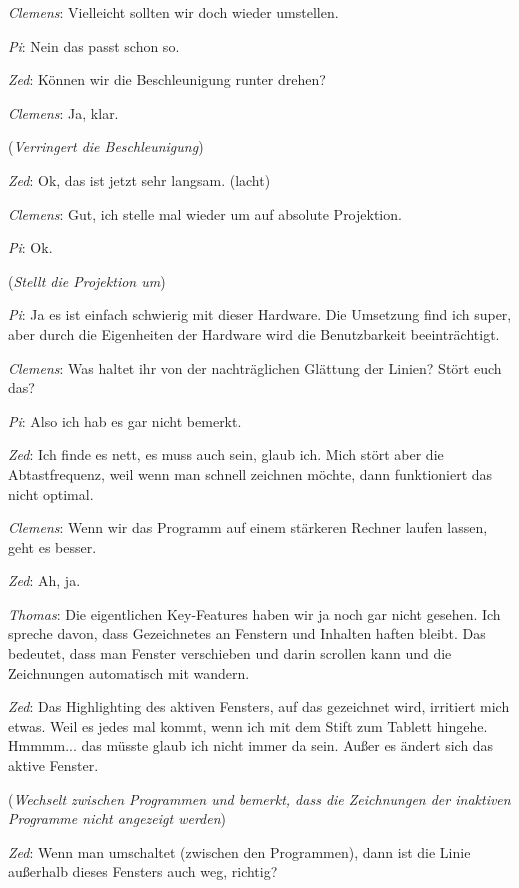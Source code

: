 \medskip \emph{Clemens}: Vielleicht sollten wir doch wieder umstellen.

\medskip \emph{Pi}: Nein das passt schon so.

\medskip \emph{Zed}: Können wir die Beschleunigung runter drehen?

\medskip \emph{Clemens}: Ja, klar.

\medskip (\emph{Verringert die Beschleunigung})

\medskip \emph{Zed}: Ok, das ist jetzt sehr langsam. (lacht)

\medskip \emph{Clemens}: Gut, ich stelle mal wieder um auf absolute Projektion.

\medskip \emph{Pi}: Ok.

\medskip (\emph{Stellt die Projektion um})

\medskip \emph{Pi}: Ja es ist einfach schwierig mit dieser Hardware. Die Umsetzung find ich super, aber durch die Eigenheiten der Hardware wird die Benutzbarkeit beeinträchtigt.

\medskip \emph{Clemens}: Was haltet ihr von der nachträglichen Glättung der Linien? Stört euch das?

\medskip \emph{Pi}: Also ich hab es gar nicht bemerkt.

\medskip \emph{Zed}: Ich finde es nett, es muss auch sein, glaub ich. Mich stört aber die Abtastfrequenz, weil wenn man schnell zeichnen möchte, dann funktioniert das nicht optimal.

\medskip \emph{Clemens}: Wenn wir das Programm auf einem stärkeren Rechner laufen lassen, geht es besser.

\medskip \emph{Zed}: Ah, ja.

\medskip \emph{Thomas}: Die eigentlichen Key-Features haben wir ja noch gar nicht gesehen. Ich spreche davon, dass Gezeichnetes an Fenstern und Inhalten haften bleibt. Das bedeutet, dass man Fenster verschieben und darin scrollen kann und die Zeichnungen automatisch mit wandern.

\medskip \emph{Zed}: Das Highlighting des aktiven Fensters, auf das gezeichnet wird, irritiert mich etwas. Weil es jedes mal kommt, wenn ich mit dem Stift zum Tablett hingehe. Hmmmm... das müsste glaub ich nicht immer da sein. Außer es ändert sich das aktive Fenster. 

\medskip (\emph{Wechselt zwischen Programmen und bemerkt, dass die Zeichnungen der inaktiven Programme nicht angezeigt werden})

\medskip \emph{Zed}: Wenn man umschaltet (zwischen den Programmen), dann ist die Linie außerhalb dieses Fensters auch weg, richtig?

